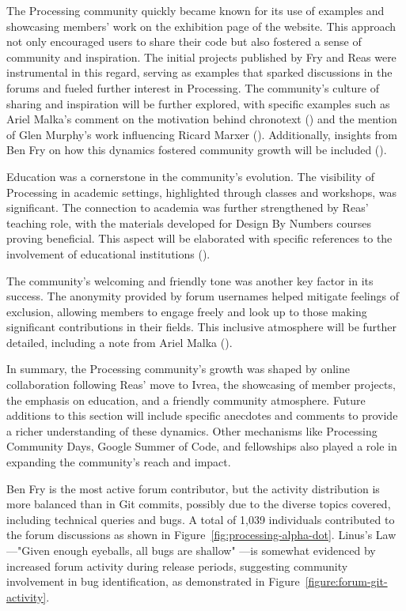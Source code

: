 The Processing community quickly became known for its use of examples and showcasing members' work on the exhibition page of the website. This approach not only encouraged users to share their code but also fostered a sense of community and inspiration. The initial projects published by Fry and Reas were instrumental in this regard, serving as examples that sparked discussions in the forums and fueled further interest in Processing. The community's culture of sharing and inspiration will be further explored, with specific examples such as Ariel Malka's comment on the motivation behind chronotext () and the mention of Glen Murphy's work influencing Ricard Marxer (). Additionally, insights from Ben Fry on how this dynamics fostered community growth will be included ().

Education was a cornerstone in the community's evolution. The visibility of Processing in academic settings, highlighted through classes and workshops, was significant. The connection to academia was further strengthened by Reas' teaching role, with the materials developed for Design By Numbers courses proving beneficial. This aspect will be elaborated with specific references to the involvement of educational institutions ().

The community's welcoming and friendly tone was another key factor in its success. The anonymity provided by forum usernames helped mitigate feelings of exclusion, allowing members to engage freely and look up to those making significant contributions in their fields. This inclusive atmosphere will be further detailed, including a note from Ariel Malka ().

In summary, the Processing community's growth was shaped by online collaboration following Reas' move to Ivrea, the showcasing of member projects, the emphasis on education, and a friendly community atmosphere. Future additions to this section will include specific anecdotes and comments to provide a richer understanding of these dynamics. Other mechanisms like Processing Community Days, Google Summer of Code, and fellowships also played a role in expanding the community's reach and impact.

Ben Fry is the most active forum contributor, but the activity distribution is more balanced than in Git commits, possibly due to the diverse topics covered, including technical queries and bugs. A total of 1,039 individuals contributed to the forum discussions as shown in Figure~\ref{fig:processing-alpha-dot}.
Linus's Law—"Given enough eyeballs, all bugs are shallow" \parencite[29]{raymondCathedralBazaar1999}—is somewhat evidenced by increased forum activity during release periods, suggesting community involvement in bug identification, as demonstrated in Figure~\ref{figure:forum-git-activity}.

